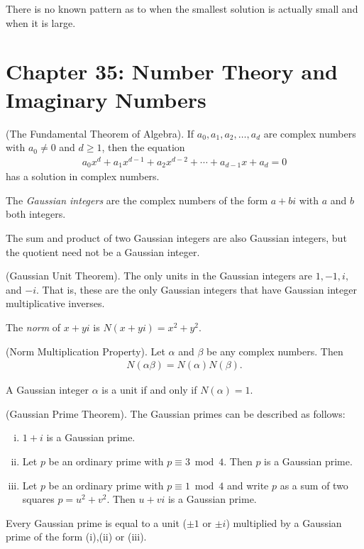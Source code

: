 \documentclass[graybox]{svmult}
\begin{document}
There is no known pattern as to when the smallest solution is actually small and when it is large.

\section*{Chapter 35: Number Theory and Imaginary Numbers}

\begin{theorem}
(The Fundamental Theorem of Algebra). If $a_0,a_1,a_2,\ldots,a_d$ are complex numbers with $a_0 \not = 0$ and $d \geqslant1$, then the equation
\begin{align*}
a_0x^d+a_1x^{d-1}+a_2x^{d-2} +\cdots +a_{d-1}x+a_d=0
\end{align*}
has a solution in complex numbers.
\end{theorem}

\begin{definition}
The \textit{Gaussian integers} are the complex numbers of the form $a+bi$ with $a$ and $b$ both integers.
\end{definition}

The sum and product of two Gaussian integers are also Gaussian integers, but the quotient need not be a Gaussian integer.

\begin{theorem}
(Gaussian Unit Theorem). The only units in the Gaussian integers are $1, -1, i,$ and $-i$. That is, these are the only Gaussian integers that have Gaussian integer multiplicative inverses.
\end{theorem}

\begin{definition}
The \textit{norm} of $x+yi$ is $N(x+yi)=x^2 + y^2$.
\end{definition}

\begin{theorem}
(Norm Multiplication Property). Let $\alpha$ and $\beta$ be any complex numbers. Then
\begin{align*}
N(\alpha\beta)=N(\alpha)N(\beta).
\end{align*}
\end{theorem}

A Gaussian integer $\alpha$ is a unit if and only if $N(\alpha)=1$.

\begin{svgraybox}
\begin{theorem}
(Gaussian Prime Theorem). The Gaussian primes can be described as follows:
\begin{enumerate}[(i)]
\item $1+i$ is a Gaussian prime.
\item Let $p$ be an ordinary prime with $p\equiv 3\bmod 4$. Then $p$ is a Gaussian prime.
\item Let $p$ be an ordinary prime with $p\equiv 1\bmod 4$ and write $p$ as a sum of two squares $p=u^2+v^2$. Then $u+vi$ is a Gaussian prime.
\end{enumerate}
Every Gaussian prime is equal to a unit ($\pm1$ or $\pm i$) multiplied by a Gaussian prime of the form (i),(ii) or (iii).
\end{theorem}
\end{svgraybox}
\end{document}
